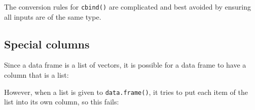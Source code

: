 \begin{Shaded}
\begin{Highlighting}[]
\StringTok{ }\NormalTok{(}\NormalTok{(} \NormalTok{:}\NormalTok{, } \NormalTok{(}\NormalTok{, }\NormalTok{)))}
\StringTok{ }\NormalTok{(} \NormalTok{:}\NormalTok{, } \NormalTok{(}\NormalTok{, }\NormalTok{),}
   \NormalTok{)}
\end{Highlighting}
\end{Shaded}

The conversion rules for \texttt{cbind()} are complicated and best
avoided by ensuring all inputs are of the same type.

\subsection{Special columns}

Since a data frame is a list of vectors, it is possible for a data frame
to have a column that is a list: 

\begin{Shaded}
\begin{Highlighting}[]
\StringTok{ }\NormalTok{(} \NormalTok{:}\NormalTok{)}
\StringTok{ }\NormalTok{(}\NormalTok{:}\NormalTok{, }\NormalTok{:}\NormalTok{, }\NormalTok{:}\NormalTok{)}
\end{Highlighting}
\end{Shaded}

However, when a list is given to \texttt{data.frame()}, it tries to put
each item of the list into its own column, so this fails:

